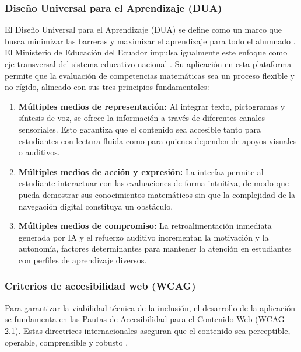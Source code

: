 \subsubsection{Diseño Universal para el Aprendizaje (DUA)}

El Diseño Universal para el Aprendizaje (DUA) se define como un marco
que busca minimizar las barreras y maximizar el aprendizaje para todo
el alumnado \cite{rose2002udl}. El Ministerio de Educación del Ecuador
impulsa igualmente este enfoque como eje transversal del sistema
educativo nacional \cite{mineduc2023dua}. Su aplicación en esta
plataforma permite que la evaluación de competencias matemáticas sea un
proceso flexible y no rígido, alineado con sus tres principios
fundamentales:

\begin{enumerate}[leftmargin=*]
  \item \textbf{Múltiples medios de representación:} Al integrar texto,
  pictogramas y síntesis de voz, se ofrece la información a través de
  diferentes canales sensoriales. Esto garantiza que el contenido sea
  accesible tanto para estudiantes con lectura fluida como para quienes
  dependen de apoyos visuales o auditivos.

  \item \textbf{Múltiples medios de acción y expresión:} La interfaz
  permite al estudiante interactuar con las evaluaciones de forma
  intuitiva, de modo que pueda demostrar sus conocimientos matemáticos
  sin que la complejidad de la navegación digital constituya un
  obstáculo.

  \item \textbf{Múltiples medios de compromiso:} La retroalimentación
  inmediata generada por IA y el refuerzo auditivo incrementan la
  motivación y la autonomía, factores determinantes para mantener la
  atención en estudiantes con perfiles de aprendizaje diversos.
\end{enumerate}

\subsubsection{Criterios de accesibilidad web (WCAG)}

Para garantizar la viabilidad técnica de la inclusión, el desarrollo
de la aplicación se fundamenta en las Pautas de Accesibilidad para el
Contenido Web (WCAG 2.1). Estas directrices internacionales aseguran
que el contenido sea perceptible, operable, comprensible y robusto
\cite{w3c2018wcag}.


